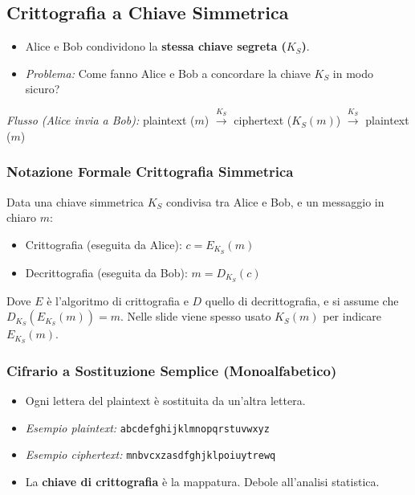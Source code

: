 \subsection{Crittografia a Chiave Simmetrica}
\begin{itemize}
    \item Alice e Bob condividono la \textbf{stessa chiave segreta ($K_S$)}.
    \item \textit{Problema:} Come fanno Alice e Bob a concordare la chiave $K_S$ in modo sicuro?
\end{itemize}
\textit{Flusso (Alice invia a Bob):} plaintext ($m$) $\xrightarrow{K_S}$ ciphertext ($K_S(m)$) $\xrightarrow{K_S}$ plaintext ($m$)

\subsubsection{Notazione Formale Crittografia Simmetrica}
\label{ssubsec:notazione_simmetrica}
Data una chiave simmetrica $K_S$ condivisa tra Alice e Bob, e un messaggio in chiaro $m$:
\begin{itemize}
    \item Crittografia (eseguita da Alice): $c = E_{K_S}(m)$
    \item Decrittografia (eseguita da Bob): $m = D_{K_S}(c)$
\end{itemize}
Dove $E$ è l'algoritmo di crittografia e $D$ quello di decrittografia, e si assume che $D_{K_S}(E_{K_S}(m)) = m$.
Nelle slide viene spesso usato $K_S(m)$ per indicare $E_{K_S}(m)$.

\subsubsection{Cifrario a Sostituzione Semplice (Monoalfabetico)}
\begin{itemize}
    \item Ogni lettera del plaintext è sostituita da un'altra lettera.
    \item \textit{Esempio plaintext:} \texttt{abcdefghijklmnopqrstuvwxyz}
    \item \textit{Esempio ciphertext:} \texttt{mnbvcxzasdfghjklpoiuytrewq}
    \item La \textbf{chiave di crittografia} è la mappatura. Debole all'analisi statistica.
\end{itemize}

